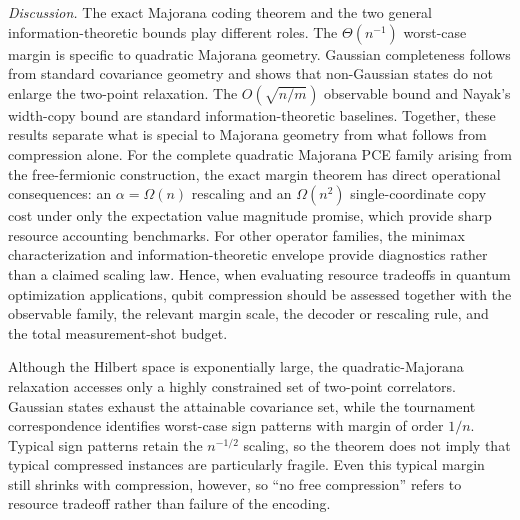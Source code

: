 \documentclass[10pt,aps,pra,twocolumn,superscriptaddress,nofootinbib,longbibliography]{revtex4-2}
\begin{document}
\emph{Discussion.} The exact Majorana coding theorem and the two general information-theoretic bounds play different roles.  The $\Theta(n^{-1})$ worst-case margin is specific to quadratic Majorana geometry.  Gaussian completeness follows from standard covariance geometry and shows that non-Gaussian states do not enlarge the two-point relaxation.  The $O(\!\sqrt{n/m})$ observable bound and Nayak's width-copy bound are standard information-theoretic baselines.  Together, these results separate what is special to Majorana geometry from what follows from compression alone.  For the complete quadratic Majorana PCE family arising from the free-fermionic construction, the exact margin theorem has direct operational consequences: an $\alpha=\Omega(n)$ rescaling and an $\Omega(n^2)$ single-coordinate copy cost under only the expectation value magnitude promise, which provide sharp resource accounting benchmarks.  For other operator families, the minimax characterization and information-theoretic envelope provide diagnostics rather than a claimed scaling law.  Hence, when evaluating resource tradeoffs in quantum optimization applications, qubit compression should be assessed together with the observable family, the relevant margin scale, the decoder or rescaling rule, and the total measurement-shot budget.

Although the Hilbert space is exponentially large, the quadratic-Majorana relaxation accesses only a highly constrained set of two-point correlators.  Gaussian states exhaust the attainable covariance set, while the tournament correspondence identifies worst-case sign patterns with margin of order $1/n$.  Typical sign patterns retain the $n^{-1/2}$ scaling, so the theorem does not imply that typical compressed instances are particularly fragile.  Even this typical margin still shrinks with compression, however, so ``no free compression'' refers to resource tradeoff rather than failure of the encoding.
\end{document}
